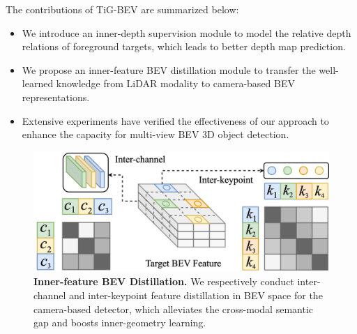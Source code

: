 The contributions of TiG-BEV are summarized below:
\begin{itemize}[leftmargin=*,itemsep=0pt,topsep=0pt]
    \item We introduce an inner-depth supervision module to model the relative depth relations of foreground targets, which leads to better depth map prediction.
    \item We propose an inner-feature BEV distillation module to transfer the well-learned knowledge from LiDAR modality to camera-based BEV representations. 
    \item Extensive experiments have verified the effectiveness of our approach to enhance the capacity for multi-view BEV 3D object detection.
\end{itemize}
\begin{figure}[!t]
    \centering
    \includegraphics[scale=0.115]{cvpr_2022/iccv_fig3.drawio.png}
    \caption{\textbf{Inner-feature BEV Distillation.} We respectively conduct inter-channel and inter-keypoint feature distillation in BEV space for the camera-based detector, which alleviates the cross-modal semantic gap and boosts inner-geometry learning.}
    \label{fig:fig3}
\end{figure}